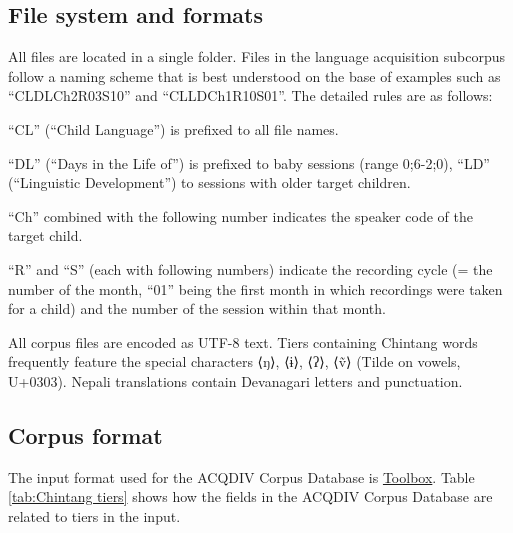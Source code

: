 \documentclass[a4paper, 11pt]{book}
\begin{document}
\subsection{File system and formats}

All files are located in a single folder. Files in the language acquisition subcorpus follow a naming scheme that is best understood on the base of examples such as “CLDLCh2R03S10” and “CLLDCh1\-R10S01”. The detailed rules are as follows: 

\begin{itemize*}
	\item “CL” (“Child Language”) is prefixed to all file names. 
	\item “DL” (“Days in the Life of”) is prefixed to baby sessions (range 0;6-2;0), “LD” (“Linguistic Development”) to sessions with older target children. 
	\item “Ch” combined with the following number indicates the speaker code of the target child.
	\item “R” and “S” (each with following numbers) indicate the recording cycle (= the number of the month, “01” being the first month in which recordings
		were taken for a child) and the number of the session within that month. 
\end{itemize*}

All corpus files are encoded as UTF-8 text. Tiers containing Chintang words frequently feature the special characters ⟨ŋ⟩, ⟨ɨ⟩, ⟨ʔ⟩, ⟨ṽ⟩ (Tilde on vowels, U+0303). Nepali translations contain Devanagari letters and punctuation. 

\subsection{Corpus format}

The input format used for the ACQDIV Corpus Database is \hyperref[subsec:Toolbox]{Toolbox}. Table \autoref{tab:Chintang tiers} shows how the fields in the ACQDIV Corpus Database are related to tiers in the input.
\end{document}
